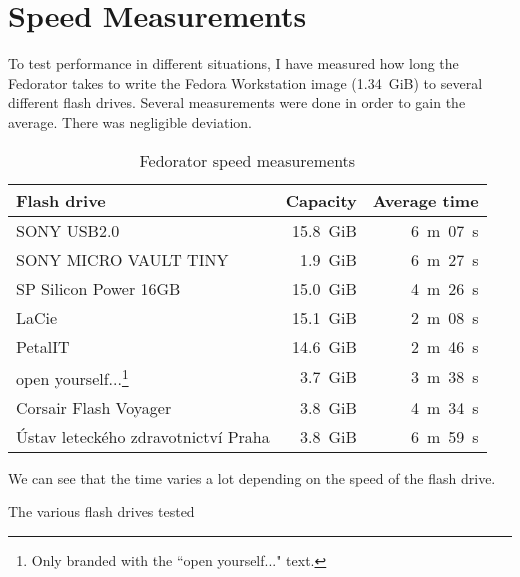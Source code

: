     \section{Speed Measurements}
        To test performance in different situations, I have measured how long the Fedorator takes to write the Fedora Workstation image (1.34~GiB) to several different flash drives.  Several measurements were done in order to gain the average.  There was negligible deviation.
        
        \begin{table}[htbp]
        \centering
        \caption{Fedorator speed measurements}
        \label{usb-duplicators}
            \begin{tabular}{ m{15em}  r r }
            \toprule
                \textbf{Flash drive} & \textbf{Capacity} & \textbf{Average time} \\
            \toprule
            
       SONY USB2.0              & 15.8~GiB & 6~m~07~s \\
\hline SONY MICRO VAULT TINY    &  1.9~GiB & 6~m~27~s \\
\hline SP Silicon Power 16GB    & 15.0~GiB & 4~m~26~s \\
\hline LaCie                    & 15.1~GiB & 2~m~08~s \\
\hline PetalIT                  & 14.6~GiB & 2~m~46~s \\
\hline open yourself...\footnote{Only branded with the ``open yourself..." text.}
                                &  3.7~GiB & 3~m~38~s \\
\hline Corsair Flash Voyager    &  3.8~GiB & 4~m~34~s \\
\hline Ústav leteckého zdravotnictví Praha &  3.8~GiB & 6~m~59~s \\
\hline
            \end{tabular}
        \end{table}
        
        We can see that the time varies a lot depending on the speed of the flash drive.
        
            {The various flash drives tested}
        
        
        \begin{comment}
        \todo{These are the final instructions that will be the "result" of the work.  Should they be inlined here?}
        \subsection{Bill of Materials}
            \todo{What is needed to get started - include a table and cost}
            \blind[3]
        \subsection{Step-by-step tutorial}
            \todo{The meat: how to build it from grounds up}
            \todo{Will not be present here, rather as an attachment.}
        \end{comment}
